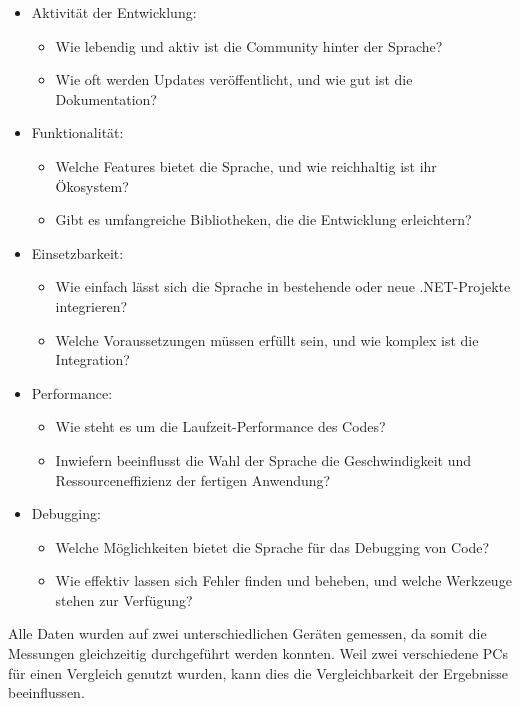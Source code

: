 \begin{itemize}
    \item Aktivität der Entwicklung: 
    \begin{itemize}
        \item Wie lebendig und aktiv ist die Community hinter der Sprache? 
        \item Wie oft werden Updates veröffentlicht, und wie gut ist die Dokumentation?
    \end{itemize}
    \item Funktionalität:
    \begin{itemize}
        \item Welche Features bietet die Sprache, und wie reichhaltig ist ihr Ökosystem? 
        \item Gibt es umfangreiche Bibliotheken, die die Entwicklung erleichtern?
    \end{itemize}
    \item Einsetzbarkeit:
    \begin{itemize}
        \item Wie einfach lässt sich die Sprache in bestehende oder neue .NET-Projekte integrieren?
        \item Welche Voraussetzungen müssen erfüllt sein, und wie komplex ist die Integration?
    \end{itemize}
    \item Performance:
    \begin{itemize}
        \item Wie steht es um die Laufzeit-Performance des Codes? 
        \item  Inwiefern beeinflusst die Wahl der Sprache die Geschwindigkeit und Ressourceneffizienz der fertigen Anwendung?
    \end{itemize}
    \item Debugging:
    \begin{itemize}
        \item Welche Möglichkeiten bietet die Sprache für das Debugging von Code?
        \item Wie effektiv lassen sich Fehler finden und beheben, und welche Werkzeuge stehen zur Verfügung?
    \end{itemize}
\end{itemize}

\newpage
Alle Daten wurden auf zwei unterschiedlichen Geräten gemessen, da somit die Messungen gleichzeitig durchgeführt werden konnten.
Weil zwei verschiedene PCs für einen Vergleich genutzt wurden, kann dies die Vergleichbarkeit der Ergebnisse beeinflussen.

